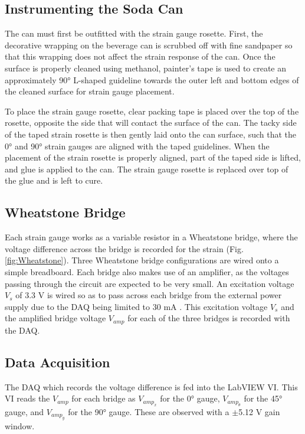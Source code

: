 \documentclass[10pt,journal,letterpaper]{IEEEtran}
\begin{document}
\subsection{Instrumenting the Soda Can}

The can must first be outfitted with the strain gauge rosette.
First, the decorative wrapping on the beverage can is scrubbed off with fine sandpaper so that this wrapping does not affect the strain response of the can.
Once the surface is properly cleaned using methanol, painter's tape is used to create an approximately \ang{90} L-shaped guideline towards the outer left and bottom edges of the cleaned surface for strain gauge placement.

To place the strain gauge rosette, clear packing tape is placed over the top of the rosette, opposite the side that will contact the surface of the can.
The tacky side of the taped strain rosette is then gently laid onto the can surface, such that the \ang{0} and \ang{90} strain gauges are aligned with the taped guidelines.
When the placement of the strain rosette is properly aligned, part of the taped side is lifted, and glue is applied to the can.
The strain gauge rosette is replaced over top of the glue and is left to cure. 

\subsection{Wheatstone Bridge}

Each strain gauge works as a variable resistor in a Wheatstone bridge, where the voltage difference across the bridge is recorded for the strain (Fig. \ref{fig:Wheatstone}).
Three Wheatstone bridge configurations are wired onto a simple breadboard.
Each bridge also makes use of an amplifier, as the voltages passing through the circuit are expected to be very small.
An excitation voltage $V_s$ of 3.3 V is wired so as to pass across each bridge from the external power supply due to the DAQ being limited to 30 mA \cite{b10}.
This excitation voltage $V_s$ and the amplified bridge voltage $V_{amp}$ for each of the three bridges is recorded with the DAQ.

\subsection{Data Acquisition}

The DAQ which records the voltage difference is fed into the LabVIEW VI.
This VI reads the $V_{amp}$ for each bridge as $V_{amp_x}$ for the \ang{0} gauge, $V_{amp_\theta}$  for the \ang{45} gauge, and $V_{amp_y}$ for the \ang{90} gauge.
These are observed with a $\pm$5.12 V gain window.
\end{document}
